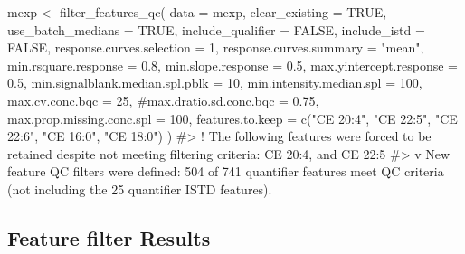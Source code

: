 \documentclass[
  letterpaper,
  DIV=11,
  numbers=noendperiod]{scrartcl}
\newenvironment{Shaded}{\begin{snugshade}}{\end{snugshade}}
\newcommand{\AttributeTok}[1]{\textcolor[rgb]{0.40,0.45,0.13}{#1}}
\newcommand{\CommentTok}[1]{\textcolor[rgb]{0.37,0.37,0.37}{#1}}
\newcommand{\ConstantTok}[1]{\textcolor[rgb]{0.56,0.35,0.01}{#1}}
\newcommand{\DecValTok}[1]{\textcolor[rgb]{0.68,0.00,0.00}{#1}}
\newcommand{\FloatTok}[1]{\textcolor[rgb]{0.68,0.00,0.00}{#1}}
\newcommand{\FunctionTok}[1]{\textcolor[rgb]{0.28,0.35,0.67}{#1}}
\newcommand{\NormalTok}[1]{\textcolor[rgb]{0.00,0.23,0.31}{#1}}
\newcommand{\OtherTok}[1]{\textcolor[rgb]{0.00,0.23,0.31}{#1}}
\newcommand{\SpecialCharTok}[1]{\textcolor[rgb]{0.37,0.37,0.37}{#1}}
\newcommand{\StringTok}[1]{\textcolor[rgb]{0.13,0.47,0.30}{#1}}
\begin{document}
\begin{Shaded}
\begin{Highlighting}[]
\NormalTok{mexp  }\OtherTok{\textless{}{-}} \FunctionTok{filter\_features\_qc}\NormalTok{(}
  \AttributeTok{data =}\NormalTok{  mexp, }
  \AttributeTok{clear\_existing =} \ConstantTok{TRUE}\NormalTok{,}
  \AttributeTok{use\_batch\_medians =} \ConstantTok{TRUE}\NormalTok{,}
  \AttributeTok{include\_qualifier =} \ConstantTok{FALSE}\NormalTok{,}
  \AttributeTok{include\_istd =} \ConstantTok{FALSE}\NormalTok{,}
  \AttributeTok{response.curves.selection =} \DecValTok{1}\NormalTok{,}
  \AttributeTok{response.curves.summary =} \StringTok{"mean"}\NormalTok{,}
  \AttributeTok{min.rsquare.response =} \FloatTok{0.8}\NormalTok{,}
  \AttributeTok{min.slope.response =} \FloatTok{0.5}\NormalTok{,}
  \AttributeTok{max.yintercept.response =} \FloatTok{0.5}\NormalTok{,}
  \AttributeTok{min.signalblank.median.spl.pblk =} \DecValTok{10}\NormalTok{,}
  \AttributeTok{min.intensity.median.spl =} \DecValTok{100}\NormalTok{,}
  \AttributeTok{max.cv.conc.bqc =} \DecValTok{25}\NormalTok{,}
  \CommentTok{\#max.dratio.sd.conc.bqc = 0.75,}
  \AttributeTok{max.prop.missing.conc.spl =} \DecValTok{100}\NormalTok{,}
  \AttributeTok{features.to.keep =} \FunctionTok{c}\NormalTok{(}\StringTok{"CE 20:4"}\NormalTok{, }\StringTok{"CE 22:5"}\NormalTok{, }\StringTok{"CE 22:6"}\NormalTok{, }\StringTok{"CE 16:0"}\NormalTok{, }\StringTok{"CE 18:0"}\NormalTok{)}
\NormalTok{)}
\CommentTok{\#\textgreater{} ! The following features were forced to be retained despite not meeting filtering criteria: CE 20:4, and CE 22:5}
\CommentTok{\#\textgreater{} v }
\NormalTok{New feature QC filters were defined}\SpecialCharTok{:} \DecValTok{504}\NormalTok{ of }\DecValTok{741}\NormalTok{ quantifier features meet QC }\FunctionTok{criteria}\NormalTok{ (not including the }\DecValTok{25}\NormalTok{ quantifier ISTD features).}
\end{Highlighting}
\end{Shaded}

\subsection{Feature filter Results}\label{feature-filter-results}
\end{document}
